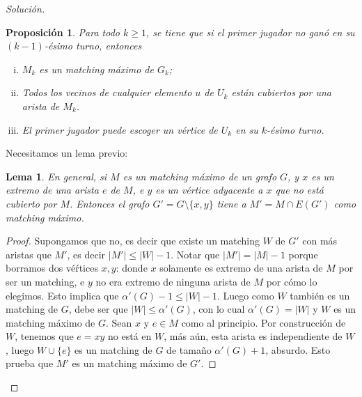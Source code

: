 \documentclass[12pt]{report}
\theoremstyle{plain}
\newtheorem{lemma}[theorem]{Lema}
\newtheorem{proposition}[theorem]{Proposición}
\theoremstyle{definition}
\newenvironment{solution}{\begin{proof}[Solución]}{\end{proof}}
\newcommand{\abs}[1]{\left \vert #1 \right \vert}
\begin{document}
\begin{solution}
\begin{enumerate}[(a)]
\begin{proposition}\label{proposicion}
Para todo $k \geq 1$, se tiene que si el primer jugador no ganó en su $(k-1)$-ésimo turno, entonces
\begin{enumerate}[(i)]
\item $M_k$ es un matching máximo de $G_k$;
\item Todos los vecinos de cualquier elemento $u$ de $U_k$ están cubiertos por una arista de $M_k$.
\item El primer jugador puede escoger un vértice de $U_k$ en su $k$-ésimo turno.
\end{enumerate}
\end{proposition}

Necesitamos un lema previo:

\begin{lemma}\label{lema}
En general, si $M$ es un matching máximo de un grafo $G$, y $x$ es un extremo de una arista $e$ de $M$, e $y$ es un vértice adyacente a $x$ que no está cubierto por $M$. Entonces el grafo $G' = G \setminus \{x,y\}$ tiene a $M' = M \cap E(G')$ como matching máximo.
\end{lemma}
\begin{proof}
Supongamos que no, es decir que existe un matching $W$ de $G'$ con más aristas que $M'$, es decir $\abs {M'} \leq \abs W - 1$. Notar que $\abs {M'} = \abs M - 1$ porque borramos dos véŕtices $x,y$: donde $x$ solamente es extremo de una arista de $M$ por ser un matching, e $y$ no era extremo de ninguna arista de $M$ por cómo lo elegimos. Esto implica que $\alpha ' (G) - 1 \leq \abs W - 1$. Luego como $W$ también es un matching de $G$, debe ser que $\abs W \leq \alpha ' (G)$, con lo cual $\alpha ' (G) = \abs W$ y $W$ es un matching máximo de $G$. Sean $x$ y $e \in M$ como al principio. Por construcción de $W$, tenemos que $e = xy$ no está en $W$, más aún, esta arista es independiente de $W$, luego $W \cup \{e \}$ es un matching de $G$ de tamaño $\alpha ' (G) + 1$, absurdo. Esto prueba que $M'$ es un matching máximo de $G'$.
\end{proof}


\end{enumerate}
\end{solution}
\end{document}
